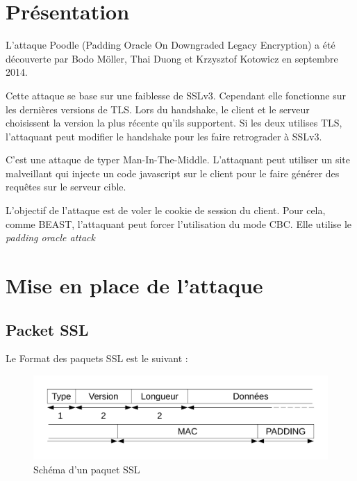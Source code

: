 
\chapter{Présentation}
\label{chapter:poodlePres}

L'attaque Poodle (Padding Oracle On Downgraded Legacy Encryption)
a été découverte par Bodo Möller, Thai Duong et 
Krzysztof Kotowicz en septembre 2014.

Cette attaque se base sur une faiblesse de SSLv3.
Cependant elle fonctionne sur les dernières versions de TLS.
Lors du handshake, le client et le serveur choisissent la version
la plus récente qu'ils supportent. Si les deux utilises TLS,
l'attaquant peut modifier le handshake pour les faire retrograder
à SSLv3.

C'est une attaque de typer Man-In-The-Middle.
L'attaquant peut utiliser un site malveillant qui injecte un
code javascript sur le client pour le faire générer des requêtes
sur le serveur cible.

L'objectif de l'attaque est de voler le cookie de session 
du client. Pour cela, comme BEAST, l'attaquant peut forcer 
l'utilisation du mode CBC. Elle utilise le \emph{padding oracle attack }

\chapter{Mise en place de l'attaque}
\label{chapter:Poodleattack}

\section{Packet SSL}
\label{sec:packet}

Le Format des paquets SSL est le suivant : 

\begin{figure}[h] 
  \centering
  \includegraphics[scale=0.5]{schemaSSL2.pdf}
  \caption{Schéma d'un paquet SSL}
  \label{fig:ssl}
\end{figure}


